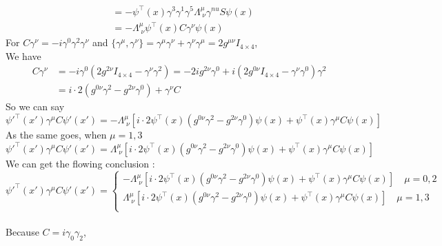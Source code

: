 \documentclass[12pt]{article}
\begin{document}
\begin{spacing}{1.5}
\begin{equation}
\begin{aligned}
&= -\psi^{\top}(x)\gamma^{3}\gamma^{1}\gamma^{5}\Lambda^{\mu}_{\;\nu}\gamma^{nu}S\psi(x) \\
&= -\Lambda^{\mu}_{\;\nu}\psi^{\top}(x)C\gamma^{\nu}\psi(x)
\end{aligned}	\tag{1.2.2}
\end{equation}
For \;$C\gamma^{\nu}=-i\gamma^{0}\gamma^{2}\gamma^{\nu}$\; and $\{\gamma^{\mu},\gamma^{\nu}\}=\gamma^{\mu}\gamma^{\nu}+\gamma^{\nu}\gamma^{\mu}=2g^{\mu\nu}I_{4\times4}$\;,\\
We have
\begin{equation}
\begin{aligned}
\displaystyle  C\gamma^{\nu} &= -i\gamma^{0}(2g^{2\nu}I_{4\times4}-\gamma^{\nu}\gamma^{2})=-2i g^{2\nu}\gamma^{0}+i(2g^{0\nu} I_{4 \times 4}-\gamma^{\nu}\gamma^{0})\gamma^{2} \\
&=i\cdot2(g^{0\nu}\gamma^{2}-g^{2\nu}\gamma^{0})+\gamma^{\nu}C		%
\end{aligned}	\tag{1.2.3}
\end{equation}
So we can say
\begin{equation}
\psi'^{\top}(x')\gamma^{\mu}C\psi'(x')=-\Lambda^{\mu}_{\;\nu}\left[i\cdot2\psi^{\top}(x)(g^{0\nu}\gamma^{2}-g^{2\nu}\gamma^{0})\psi(x)+\psi^{\top}(x)\gamma^{\mu}C\psi(x)\right]		\tag{1.2.4}
\end{equation}
As the same goes, when $\mu=1, 3$ \\
\begin{equation}
\psi'^{\top}(x')\gamma^{\mu}C\psi'(x')=\Lambda^{\mu}_{\;\nu}[i\cdot2\psi^{\top}(x)(g^{0\nu}\gamma^{2}-g^{2\nu}\gamma^{0})\psi(x)+\psi^{\top}(x)\gamma^{\mu}C\psi(x)]	
	\tag{1.2.5}
\end{equation}
We can get the flowing conclusion :
\begin{equation}
\psi'^{\top}(x')\gamma^{\mu}C\psi'(x')=\left\{		%
\begin{aligned}
-\Lambda^{\mu}_{\;\nu}\left[i\cdot2\psi^{\top}(x)(g^{0\nu}\gamma^{2}-g^{2\nu}\gamma^{0})\psi(x)+\psi^{\top}(x)\gamma^{\mu}C\psi(x)\right] \quad \mu=0, 2\\
\Lambda^{\mu}_{\;\nu}\left[i\cdot2\psi^{\top}(x)(g^{0\nu}\gamma^{2}-g^{2\nu}\gamma^{0})\psi(x)+\psi^{\top}(x)\gamma^{\mu}C\psi(x)\right] \quad \mu=1, 3\\
\end{aligned}
\right.	%
	\tag{1.2.6}
\end{equation}
~\\
Because $C=i\gamma_{0}\gamma_{2}$, \\

\end{spacing}
\end{document}
